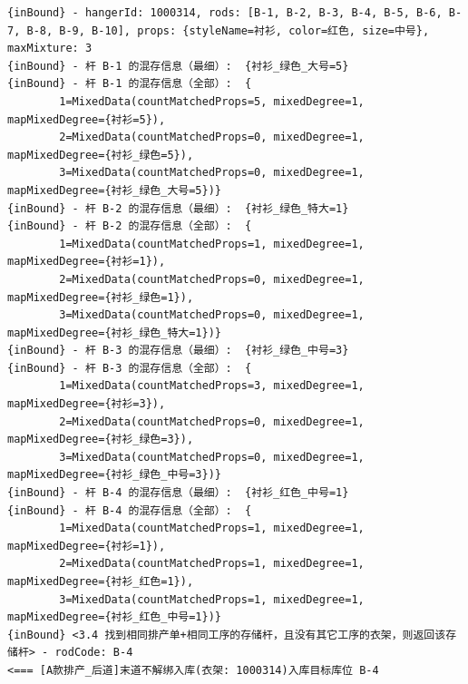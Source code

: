 {\begin{verbatim}
{inBound} - hangerId: 1000314, rods: [B-1, B-2, B-3, B-4, B-5, B-6, B-7, B-8, B-9, B-10], props: {styleName=衬衫, color=红色, size=中号}, maxMixture: 3
{inBound} - 杆 B-1 的混存信息（最细）:  {衬衫_绿色_大号=5}
{inBound} - 杆 B-1 的混存信息（全部）:  {
		1=MixedData(countMatchedProps=5, mixedDegree=1, mapMixedDegree={衬衫=5}), 
		2=MixedData(countMatchedProps=0, mixedDegree=1, mapMixedDegree={衬衫_绿色=5}), 
		3=MixedData(countMatchedProps=0, mixedDegree=1, mapMixedDegree={衬衫_绿色_大号=5})}
{inBound} - 杆 B-2 的混存信息（最细）:  {衬衫_绿色_特大=1}
{inBound} - 杆 B-2 的混存信息（全部）:  {
		1=MixedData(countMatchedProps=1, mixedDegree=1, mapMixedDegree={衬衫=1}), 
		2=MixedData(countMatchedProps=0, mixedDegree=1, mapMixedDegree={衬衫_绿色=1}), 
		3=MixedData(countMatchedProps=0, mixedDegree=1, mapMixedDegree={衬衫_绿色_特大=1})}
{inBound} - 杆 B-3 的混存信息（最细）:  {衬衫_绿色_中号=3}
{inBound} - 杆 B-3 的混存信息（全部）:  {
		1=MixedData(countMatchedProps=3, mixedDegree=1, mapMixedDegree={衬衫=3}), 
		2=MixedData(countMatchedProps=0, mixedDegree=1, mapMixedDegree={衬衫_绿色=3}), 
		3=MixedData(countMatchedProps=0, mixedDegree=1, mapMixedDegree={衬衫_绿色_中号=3})}
{inBound} - 杆 B-4 的混存信息（最细）:  {衬衫_红色_中号=1}
{inBound} - 杆 B-4 的混存信息（全部）:  {
		1=MixedData(countMatchedProps=1, mixedDegree=1, mapMixedDegree={衬衫=1}), 
		2=MixedData(countMatchedProps=1, mixedDegree=1, mapMixedDegree={衬衫_红色=1}), 
		3=MixedData(countMatchedProps=1, mixedDegree=1, mapMixedDegree={衬衫_红色_中号=1})}
{inBound} <3.4 找到相同排产单+相同工序的存储杆，且没有其它工序的衣架，则返回该存储杆> - rodCode: B-4
<=== [A款排产_后道]末道不解绑入库(衣架: 1000314)入库目标库位 B-4


\end{verbatim}}
